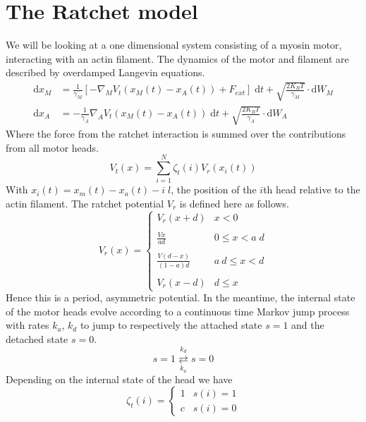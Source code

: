 \documentclass[aps,pre,onecolumn,showpacs,showkeys,a4paper]{revtex4}
\newcommand{\rmd}{{\mathrm d}}
\begin{document}
\section{The Ratchet model}
We will be looking at a one dimensional system consisting of a myosin motor, interacting with an actin filament. The dynamics of the motor and filament are described by overdamped Langevin equations. 
\begin{align}
\rmd x_M &= \frac{1}{\gamma_M} \left[ - \nabla_M V_t(x_M(t) - x_A(t)) + F_{ext} \right] \; \rmd t + \sqrt{ \frac{2 K_B T}{\gamma_M} } \cdot \rmd W_M \label{eom_M} \\
\rmd x_A &= - \frac{1}{\gamma_A} \nabla_A V_t(x_M(t) - x_A(t)) \; \rmd t + \sqrt{ \frac{2 K_B T}{\gamma_A} } \cdot \rmd W_A
\label{eom_A}
\end{align}
Where the force from the ratchet interaction is summed over the contributions from all motor heads.
\begin{equation}
V_t(x) = \sum_{i=1}^{N} \zeta_t(i) V_{r} (x_i(t))
\end{equation}
With $x_i(t) = x_{m}(t)-x_{a}(t) - i\;l$, the position of the $i$th head relative to the actin filament.
The ratchet potential $V_r$ is defined here as follows.
\begin{equation}
V_{r}(x) =  \begin{cases}
	V_r(x+d) & x < 0\\ 
	\\
      \displaystyle \frac{Vx}{ad} & 0 \leq x < a\;d \\
      \\
      \displaystyle \frac{V(d-x)}{(1-a)d} & a\ d \leq x < d\\
    \\
    V_r(x-d) & d \leq x  
   \end{cases}
   \label{rat_pot}
\end{equation}
Hence this is a period, asymmetric potential.
In the meantime, the internal state of the motor heads evolve according to a continuous time Markov jump process with rates $k_a$, $k_d$ to jump to respectively the attached state $s=1$ and the detached state $s=0$.
\begin{equation}
s = 1 \overset{k_d}{\underset{k_a}{\rightleftarrows}} s = 0
\end{equation}
Depending on the internal state of the head we have 
\begin{equation}
\zeta_t(i) =  \begin{cases} 
      1 & s(i) = 1\\
      c & s(i) = 0
   \end{cases}
\end{equation}
\end{document}

